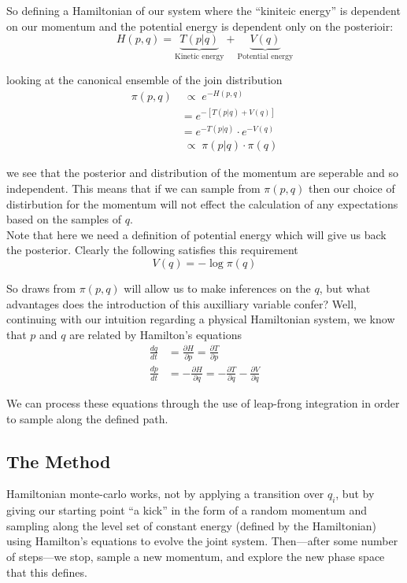 \documentclass[11pt]{report}
\begin{document}
So defining a Hamiltonian of our system where the ``kiniteic energy'' is dependent on our momentum and the potential energy is dependent only on the posterioir:
\begin{equation}
  H(p, q) = \underbrace{T(p|q)}_{\text{Kinetic energy}} + \underbrace{V(q)}_{\text{Potential energy}}
\end{equation} 

looking at the canonical ensemble of the join distribution
\begin{align}
  \pi(p, q) &\;{\propto} \; e^{-H(p, q)} \\
          &= e^{-[T(p|q) + V(q)]} \\
          &= e^{-T(p|q)} \cdot e^{-V(q)} \\
          &\;{\propto} \; \pi(p|q) \cdot \pi(q) 
\end{align}

we see that the posterior and distribution of the momentum are seperable and so independent. This means that if we can sample from $\pi(p, q)$ then our choice of distirbution for the momentum will not effect the calculation of any expectations based on the samples of $q$. \\

Note that here we need a definition of potential energy which will give us back the posterior. Clearly the following satisfies this requirement
\begin{equation}
  V(q) = - \log \pi(q)
\end{equation}

So draws from $\pi(p, q)$ will allow us to make inferences on the $q$, but what advantages does the introduction of this auxilliary variable confer? Well, continuing with our intuition regarding a physical Hamiltonian system, we know that $p$ and $q$ are related by Hamilton's equations
\begin{align}
\frac{dq}{dt} &= \frac{\partial H}{\partial p} = \frac{\partial T}{\partial p} \\
\frac{dp}{dt} &= - \frac{\partial H}{\partial q} = - \frac{\partial T}{\partial q} - \frac{\partial V}{\partial q}
\end{align}

We can process these equations through the use of leap-frong integration in order to sample along the defined path.

\subsection{The Method}
Hamiltonian monte-carlo works, not by applying a transition over $q_i$, but by giving our starting point ``a kick'' in the form of a random momentum and sampling along the level set of constant energy (defined by the Hamiltonian) using Hamilton's equations to evolve the joint system. Then---after some number of steps---we stop, sample a new momentum, and explore the new phase space that this defines. \\
\end{document}
